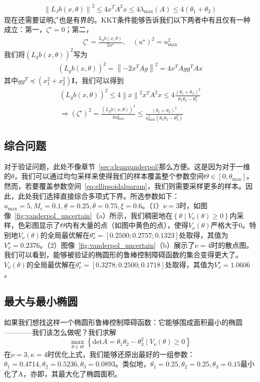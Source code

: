 \begin{eqnarray}
  \left\lVert L_Jb(x, \theta) \right\rVert^2 \le 
  4x^T A^2 x \le 4 \lambda_{\max}(A) \le 4(\theta_1 + \theta_2)
\end{eqnarray}
现在还需要证明$\zeta^\star$也是有界的。KKT条件能够告诉我们以下两者中有且仅有一种成立：第一，$\zeta^\star = 0$；第二，
\begin{eqnarray}
  \zeta^\star = \frac{L_gb(x, \theta)}{2u^\star}, \quad (u^\star)^2 = u_{\max}^2
\end{eqnarray}
我们将$(L_gb(x, \theta))^2$写为
\begin{eqnarray}
  (L_gb(x, \theta))^2 = 
  \left\lVert -2 x^T Ag \right\rVert^2 = 4 x^T Agg^T Ax
\end{eqnarray}
其中$gg^T \preceq (x_1^2 + x_2^2) \textbf{I}$，我们可以得到
\begin{eqnarray}
  (L_gb(x, \theta))^2 \le 
  4 \left\lVert x \right\rVert^2 x^T A^2 x \le 
  4 \frac{
    (\theta_1 + \theta_2)^2
  }{
    \theta_1 \theta_2 - \theta_3^2
  } \\
  \Rightarrow (\zeta^\star)^2 = 
  \frac{
    (L_gb(x, \theta))^2
  }{4 u_{\max}^2} \le 
  \frac{
    (\theta_1 + \theta_2)^2
  }{
    u_{\max}^2 (\theta_1 \theta_2 - \theta_3^2)
  }
\end{eqnarray}

\subsection{综合问题}
对于验证问题，此处不像章节~\ref{sec:cleanvanderpol}那么方便。这是因为对于一维的$\theta$，我们可以通过均匀采样来使得我们的样本覆盖整个参数空间$\Theta \in [0, \theta_{\max}]$。然而，若要覆盖参数空间~\eqref{eq:ellipsoidalparam}，我们则需要采样更多的样本。因此，此处我们选择直接综合多项式下界。所选参数如下：$u_{\max} = 5, M_\epsilon = 0.1, \underline{\theta} = 0.25, \overline{\theta} = 0.75, \xi = 0.6$。（1）$\nu = 3$时，如图像~\ref{fig:vanderpol_uncertain}（a）所示，我们稠密地在$\left\{ \theta \mid V_\nu(\theta) \ge 0 \right\}$内采样，色彩图显示了$\Theta$内有大量的点（如图中黄色的点），使得$V_\nu(\theta)$严格大于$0$。特别地$V_\nu(\theta)$的全局最优解在$\theta^\star_\nu = [0.2500;0.2757;0.1323]$处取得，其值为$V^\star_\nu = 0.2376$。（2）图像~\ref{fig:vanderpol_uncertain}（b）展示了$\nu = 4$时的散点图。我们可以看到，能够被验证的椭圆形的鲁棒控制障碍函数的集合变得更大了。$V_\nu(\theta)$的全局最优解在$\theta^\star_\nu = [0.3278;0.2500;0.1718]$处取得，其值为$V^\star_\nu = 1.0606$。

\subsection{最大与最小椭圆}
如果我们想找这样一个椭圆形鲁棒控制障碍函数：它能够围成面积最小的椭圆————我们该怎么做呢？我们求解
\begin{equation}
    \max_{\theta \in \Theta} \left\{ \text{det}A = \theta_1 \theta_2 - \theta_3^2 \mid V_\nu(\theta) \ge 0 \right\}
\end{equation}
在$\nu = 3, \kappa = 4$时优化上式，我们能够还原出最好的一组参数：$\theta_1=0.4714,\theta_2=0.5236,\theta_3 = 0.0893$。类似地，$\theta_1=0.25,\theta_2=0.25,\theta_3 = 0.15$最小化了$\text{A}$，亦即，其最大化了椭圆面积。


